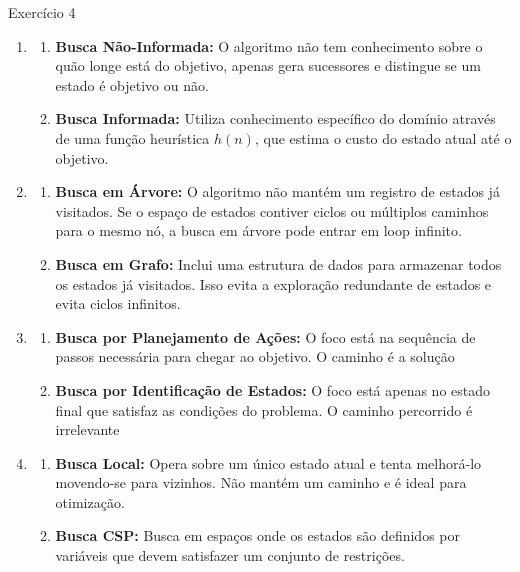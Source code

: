 \documentclass[a4paper,11pt]{article}
\theoremstyle{definition}
\theoremstyle{plain}
\theoremstyle{remark}
\newcounter{questao}[section]
\begin{document}
\begin{questaoManually}{Exercício 4}
  \begin{enumerate}[label=\Alph*]
    \item
    \begin{enumerate}[label=\arabic*.]
      \item \textbf{Busca Não-Informada:} O algoritmo não tem conhecimento sobre o quão longe está do objetivo, apenas gera sucessores e distingue se um estado é objetivo ou não.
      \item \textbf{Busca Informada:} Utiliza conhecimento específico do domínio através de uma função heurística $h(n)$, que estima o custo do estado atual até o objetivo. 
    \end{enumerate}

    \item
    \begin{enumerate}[label=\arabic*.]
      \item \textbf{Busca em Árvore:} O algoritmo não mantém um registro de estados já visitados. Se o espaço de estados contiver ciclos ou múltiplos caminhos para o mesmo nó, a busca em árvore pode entrar em loop infinito.
      \item \textbf{Busca em Grafo:} Inclui uma estrutura de dados para armazenar todos os estados já visitados. Isso evita a exploração redundante de estados e evita ciclos infinitos.
    \end{enumerate}

    \item
    \begin{enumerate}[label=\arabic*.]
      \item \textbf{Busca por Planejamento de Ações:} O foco está na sequência de passos necessária para chegar ao objetivo. O caminho é a solução
      \item \textbf{Busca por Identificação de Estados:} O foco está apenas no estado final que satisfaz as condições do problema. O caminho percorrido é irrelevante
    \end{enumerate}

    \item
    \begin{enumerate}[label=\arabic*.]
      \item \textbf{Busca Local:} Opera sobre um único estado atual e tenta melhorá-lo movendo-se para vizinhos. Não mantém um caminho e é ideal para otimização.
      \item \textbf{Busca CSP:} Busca em espaços onde os estados são definidos por variáveis que devem satisfazer um conjunto de restrições.
    \end{enumerate}


\end{enumerate}
\end{questaoManually}
\end{document}
